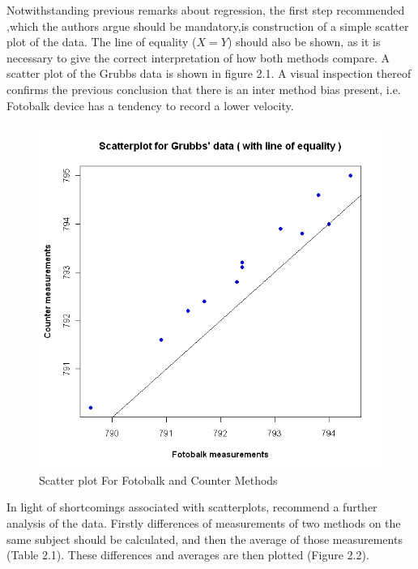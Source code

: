 \documentclass[12pt, a4paper]{report}
\theoremstyle{plain}
\theoremstyle{definition}
\theoremstyle{remark}
\begin{document}
	\smallskip
	
	Notwithstanding previous remarks about regression, the first step
	recommended ,which the authors argue should be mandatory,is
	construction of a simple scatter plot of the data. The line of
	equality ($X=Y$) should also be shown, as it is necessary to give
	the correct interpretation of how both methods compare. A scatter
	plot of the Grubbs data is shown in figure 2.1. A visual
	inspection thereof confirms the previous conclusion that there is
	an inter method bias present, i.e. Fotobalk device has a tendency
	to record a lower velocity.
	
	\begin{figure}[h!]
		\begin{center}
			\includegraphics[width=130mm]{images/GrubbsScatter.jpeg}
			\caption{Scatter plot For Fotobalk and Counter Methods}\label{GrubbsScatter}
		\end{center}
	\end{figure}
	
	In light of shortcomings associated with scatterplots,
	\citet*{BA83} recommend a further analysis of the data. Firstly
	differences of measurements of two methods on the same subject
	should  be calculated, and then the average of those measurements
	(Table 2.1). These differences and averages are then plotted
	(Figure 2.2).
	
\end{document}
